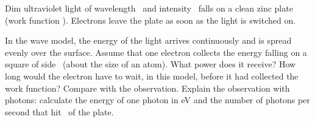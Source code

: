 Dim ultraviolet light of wavelength \laO\ and intensity \IaO\ falls on a clean zinc plate (work function \WaO). Electrons leave the plate as soon as the light is switched on.
\begin{abcliste}
\abc In the wave model, the energy of the light arrives continuously and is spread evenly over the surface. Assume that one electron collects the energy falling on a square of side \daO\ (about the size of an atom). What power does it receive?
\abc How long would the electron have to wait, in this model, before it had collected the work function? Compare with the observation.
\abc Explain the observation with photons: calculate the energy of one photon in eV and the number of photons per second that hit \AaO\ of the plate.
\end{abcliste}
